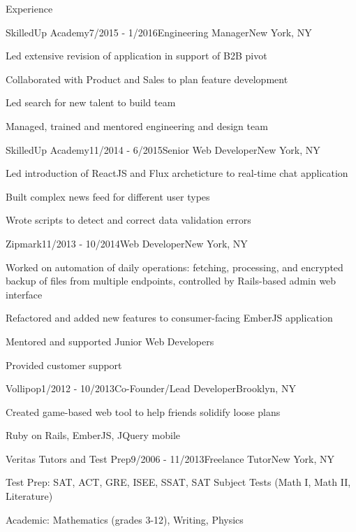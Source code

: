 \documentclass{resume} %
\begin{document}
\begin{rSection}{Experience}

\begin{rSubsection}{SkilledUp Academy}{7/2015 - 1/2016}{Engineering Manager}{New York, NY}
\item Led extensive revision of application in support of B2B pivot 
\item Collaborated with Product and Sales to plan feature development
\item Led search for new talent to build team
\item Managed, trained and mentored engineering and design team
\end{rSubsection}

\begin{rSubsection}{SkilledUp Academy}{11/2014 - 6/2015}{Senior Web Developer}{New York, NY}
\item Led introduction of ReactJS and Flux archeticture to real-time chat application
\item Built complex news feed for different user types 
\item Wrote scripts to detect and correct data validation errors
\end{rSubsection}

\begin{rSubsection}{Zipmark}{11/2013 - 10/2014}{Web Developer}{New York, NY}
\item Worked on automation of daily operations: fetching, processing, and encrypted backup of files from multiple endpoints, controlled by Rails-based admin web interface
\item Refactored and added new features to consumer-facing EmberJS application
\item Mentored and supported Junior Web Developers
\item Provided customer support
\end{rSubsection}

\begin{rSubsection}{Vollipop}{1/2012 - 10/2013}{Co-Founder/Lead Developer}{Brooklyn, NY}
\item Created game-based web tool to help friends solidify loose plans
\item Ruby on Rails, EmberJS, JQuery mobile
\end{rSubsection}

\begin{rSubsection}{Veritas Tutors and Test Prep}{9/2006 - 11/2013}{Freelance Tutor}{New York, NY}
\item Test Prep: SAT, ACT, GRE, ISEE, SSAT, SAT Subject Tests (Math I, Math II, Literature)
\item Academic: Mathematics (grades 3-12), Writing, Physics
\end{rSubsection}


\end{rSection}
\end{document}
